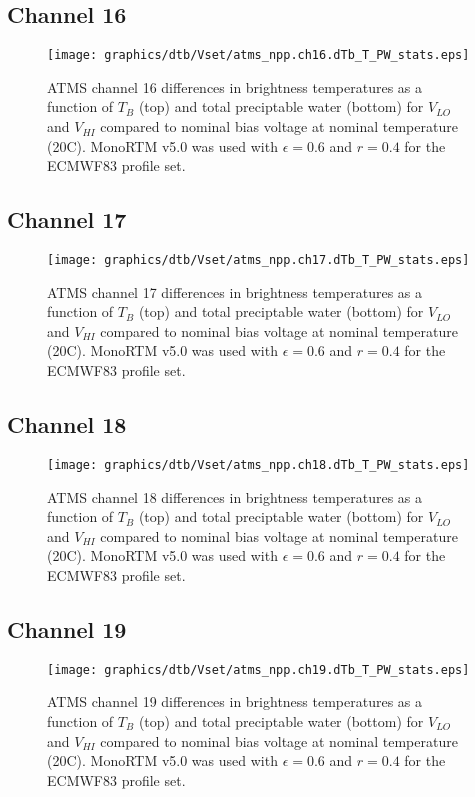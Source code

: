 \subsection{Channel 16}
\begin{figure}[H]
  \label{fig:Vset.ch16_dtb}
  \centering
  \hspace{1.5cm}\texttt{[image: graphics/dtb/Vset/atms\_npp.ch16.dTb\_T\_PW\_stats.eps]}
  \caption{ATMS channel 16 differences in brightness temperatures as a function of $T_B$ (top) and total preciptable water (bottom) for $V_{LO}$ and $V_{HI}$ compared to nominal bias voltage at nominal temperature (20\textdegree{}C). MonoRTM v5.0 was used with $\epsilon=0.6$ and $r=0.4$ for the ECMWF83 profile set.}
\end{figure}

\subsection{Channel 17}
\begin{figure}[H]
  \label{fig:Vset.ch17_dtb}
  \centering
  \hspace{1.5cm}\texttt{[image: graphics/dtb/Vset/atms\_npp.ch17.dTb\_T\_PW\_stats.eps]}
  \caption{ATMS channel 17 differences in brightness temperatures as a function of $T_B$ (top) and total preciptable water (bottom) for $V_{LO}$ and $V_{HI}$ compared to nominal bias voltage at nominal temperature (20\textdegree{}C). MonoRTM v5.0 was used with $\epsilon=0.6$ and $r=0.4$ for the ECMWF83 profile set.}
\end{figure}

\subsection{Channel 18}
\begin{figure}[H]
  \label{fig:Vset.ch18_dtb}
  \centering
  \hspace{1.5cm}\texttt{[image: graphics/dtb/Vset/atms\_npp.ch18.dTb\_T\_PW\_stats.eps]}
  \caption{ATMS channel 18 differences in brightness temperatures as a function of $T_B$ (top) and total preciptable water (bottom) for $V_{LO}$ and $V_{HI}$ compared to nominal bias voltage at nominal temperature (20\textdegree{}C). MonoRTM v5.0 was used with $\epsilon=0.6$ and $r=0.4$ for the ECMWF83 profile set.}
\end{figure}

\subsection{Channel 19}
\begin{figure}[H]
  \label{fig:Vset.ch19_dtb}
  \centering
  \hspace{1.5cm}\texttt{[image: graphics/dtb/Vset/atms\_npp.ch19.dTb\_T\_PW\_stats.eps]}
  \caption{ATMS channel 19 differences in brightness temperatures as a function of $T_B$ (top) and total preciptable water (bottom) for $V_{LO}$ and $V_{HI}$ compared to nominal bias voltage at nominal temperature (20\textdegree{}C). MonoRTM v5.0 was used with $\epsilon=0.6$ and $r=0.4$ for the ECMWF83 profile set.}
\end{figure}

